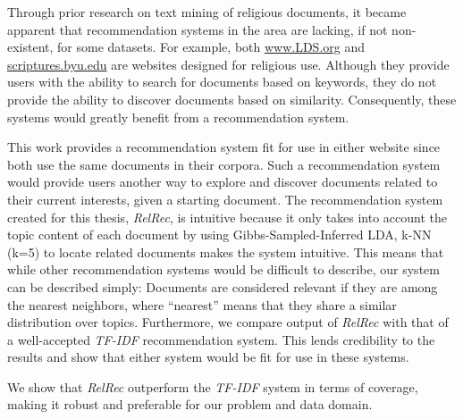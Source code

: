 
Through prior research on text mining of religious documents, it became apparent that recommendation systems in the area are lacking, if not non-existent, for some datasets. For example, both \url{www.LDS.org} and \url{scriptures.byu.edu} are websites designed for religious use. Although they provide users with the ability to search for documents based on keywords, they do not provide the ability to discover documents based on similarity. Consequently, these systems would greatly benefit from a recommendation system.

This work provides a recommendation system fit for use in either website since both use the same documents in their corpora. Such a recommendation system would provide users another way to explore and discover documents related to their current interests, given a starting document. The recommendation system created for this thesis, \emph{RelRec}, is intuitive because it only takes into account the topic content of each document by using Gibbs-Sampled-Inferred LDA, k-NN (k=5) to locate related documents makes the system intuitive. This means that while other recommendation systems would be difficult to describe, our system can be described simply: Documents are considered relevant if they are among the nearest neighbors, where ``nearest'' means that they share a similar distribution over topics. Furthermore, we compare output of \emph{RelRec} with that of a well-accepted \emph{TF-IDF} recommendation system. This lends credibility to the results and show that either system would be fit for use in these systems.

We show that \emph{RelRec} outperform the \emph{TF-IDF} system in terms of coverage, making it robust and preferable for our problem and data domain. %
